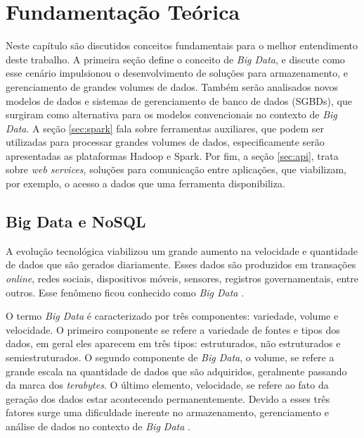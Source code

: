 
\chapter{Fundamentação Teórica}
\label{chap:fundamentacaoTeorica}

Neste capítulo são discutidos conceitos fundamentais para o melhor entendimento deste 
trabalho. A primeira seção define o conceito de \textit{Big Data}, e discute como esse 
cenário impulsionou o desenvolvimento de soluções para armazenamento, e gerenciamento de 
grandes volumes de dados. Também serão analisados novos modelos de dados e sistemas de 
gerenciamento de banco de dados (SGBDs), que surgiram como alternativa para os modelos 
convencionais no contexto de \textit{Big Data}. A seção \ref{sec:spark} fala 
sobre ferramentas auxiliares, que podem ser utilizadas para processar grandes volumes de dados,
especificamente serão apresentadas as plataformas Hadoop e Spark. Por fim, a seção 
\ref{sec:api}, trata sobre \textit{web services}, soluções para comunicação entre aplicações, 
que viabilizam, por exemplo, o acesso a dados que uma ferramenta disponibiliza.

\section{Big Data e NoSQL}
\label{sec:bigdata}

A evolução tecnológica viabilizou um grande aumento na velocidade e quantidade de dados que 
são gerados diariamente. Esses dados são produzidos em transações \textit{online}, redes sociais, 
dispositivos móveis, sensores, registros governamentais, entre outros. Esse fenômeno ficou 
conhecido como \textit{Big Data} \cite{sagiroglu2013big}. 

O termo \textit{Big Data} é caracterizado por três componentes: variedade, volume e velocidade. 
O primeiro componente se refere a variedade de fontes e tipos dos dados, em geral eles 
aparecem em três tipos: estruturados, não estruturados e semiestruturados. O segundo componente 
de \textit{Big Data}, o volume, se refere a grande escala na quantidade de dados que são 
adquiridos, geralmente passando da marca dos \textit{terabytes}. O último elemento, 
velocidade, se refere ao fato da geração dos dados estar acontecendo permanentemente. Devido 
a esses três fatores surge uma dificuldade inerente no armazenamento, gerenciamento e 
análise de dados no contexto de \textit{Big Data} \cite{sagiroglu2013big}.

